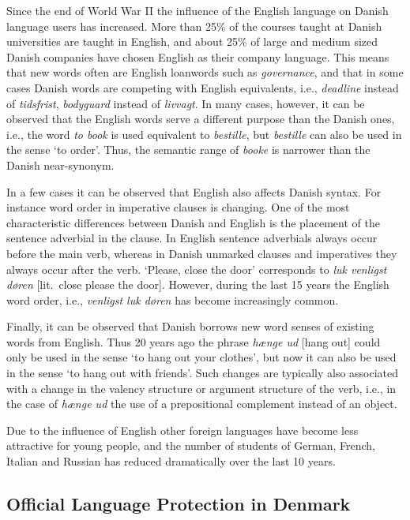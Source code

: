 \begin{multicols}{2}
Since the end of World War II the influence of the English language on Danish language users has increased. More than 25\% of the courses taught at Danish universities are taught in English, and about 25\% of large and medium sized Danish companies have chosen English as their company language.   This means that new words often are English loanwords such as {\it governance}, and that in some cases Danish words are competing with English equivalents, i.e., {\it deadline} instead of {\it tidsfrist}, {\it bodyguard} instead of {\it livvagt}. In many cases, however, it can be observed that the English words serve a different purpose than the Danish ones, i.e., the word {\it to book} is used equivalent to {\it bestille},  but {\it bestille} can also be used in the sense `to order'. Thus, the semantic range of {\it booke} is narrower than the Danish near-synonym. 

In a few cases it can be observed that English also affects Danish syntax. For instance word order in imperative clauses is changing. One of the most characteristic differences between Danish and English is the placement of the sentence adverbial in the clause. In English sentence adverbials always occur before the main verb, whereas in Danish unmarked clauses and imperatives they always occur after the verb. `Please, close the door' corresponds to {\it luk venligst d\o ren} [lit.\ close please the door]. However, during the last 15 years the English word order, i.e.,  {\it venligst luk d\o ren} has become increasingly common. 

Finally, it can be observed that Danish borrows new word senses of existing words from English. Thus 20 years ago the phrase {\it h\ae nge ud} [hang out]  could only be used in the sense `to hang out your clothes', but now it can also be used in the sense `to hang out with friends'. Such changes are typically also associated with a change in the valency structure or argument structure of the verb, i.e., in the case of {\it h\ae nge ud} the use of a prepositional complement instead of an object.

Due to the influence of English other foreign languages have become less attractive for young people, and the number of students of German, French, Italian and Russian has reduced dramatically over the last 10 years. 


\subsection{Official Language Protection in Denmark}


\end{multicols}
